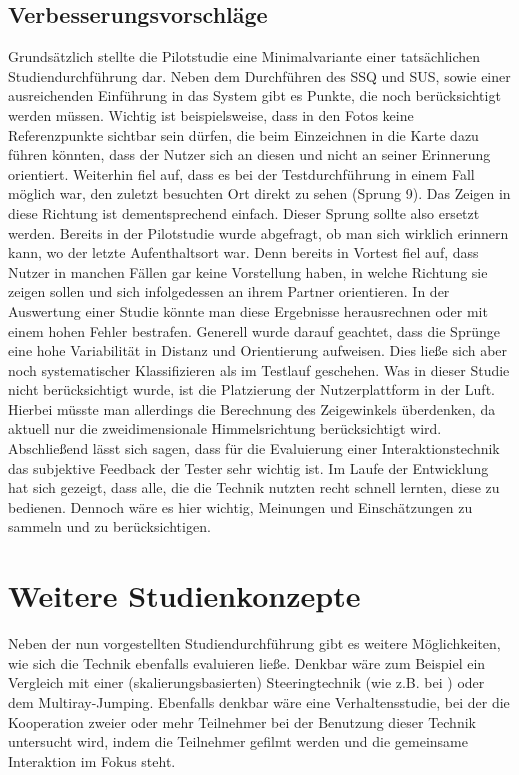 \subsection{Verbesserungsvorschläge}
Grundsätzlich stellte die Pilotstudie eine Minimalvariante einer tatsächlichen Studiendurchführung dar. Neben dem Durchführen des SSQ und SUS, sowie einer ausreichenden Einführung in das System gibt es Punkte, die noch berücksichtigt werden müssen.
Wichtig ist beispielsweise, dass in den Fotos keine Referenzpunkte sichtbar sein dürfen, die beim Einzeichnen in die Karte dazu führen könnten, dass der Nutzer sich an diesen und nicht an seiner Erinnerung orientiert. Weiterhin fiel auf, dass es bei der Testdurchführung in einem Fall möglich war, den zuletzt besuchten Ort direkt zu sehen (Sprung 9). Das Zeigen in diese Richtung ist dementsprechend einfach. Dieser Sprung sollte also ersetzt werden.
Bereits in der Pilotstudie wurde abgefragt, ob man sich wirklich erinnern kann, wo der letzte Aufenthaltsort war. Denn bereits in Vortest fiel auf, dass Nutzer in manchen Fällen gar keine Vorstellung haben, in welche Richtung sie zeigen sollen und sich infolgedessen an ihrem Partner orientieren. In der Auswertung einer Studie könnte man diese Ergebnisse herausrechnen oder mit einem hohen Fehler \glqq bestrafen\grqq{}.
Generell wurde darauf geachtet, dass die Sprünge eine hohe Variabilität in Distanz und Orientierung aufweisen. Dies ließe sich aber noch systematischer Klassifizieren als im Testlauf geschehen.
Was in dieser Studie nicht berücksichtigt wurde, ist die Platzierung der Nutzerplattform in der Luft. Hierbei müsste man allerdings die Berechnung des Zeigewinkels überdenken, da aktuell nur die zweidimensionale Himmelsrichtung berücksichtigt wird.
Abschließend lässt sich sagen, dass für die Evaluierung einer Interaktionstechnik das subjektive Feedback der Tester sehr wichtig ist. Im Laufe der Entwicklung hat sich gezeigt, dass alle, die die Technik nutzten recht schnell lernten, diese zu bedienen. Dennoch wäre es hier wichtig, Meinungen und Einschätzungen zu sammeln und zu berücksichtigen.

\section{Weitere Studienkonzepte}
Neben der nun vorgestellten Studiendurchführung gibt es weitere Möglichkeiten, wie sich die Technik ebenfalls evaluieren ließe. Denkbar wäre zum Beispiel ein Vergleich mit einer (skalierungsbasierten) Steeringtechnik (wie z.B. bei \cite{Dallat2018Giant}) oder dem Multiray-Jumping\cite{WeisskerMulti-RayReality}. Ebenfalls denkbar wäre eine Verhaltensstudie, bei der die Kooperation zweier oder mehr Teilnehmer bei der Benutzung dieser Technik untersucht wird, indem die Teilnehmer gefilmt werden und die gemeinsame Interaktion im Fokus steht.